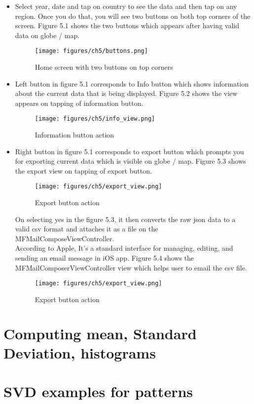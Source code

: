 \begin{itemize}
    \item Select year, date and tap on country to see the data and then tap on any region. Once you do that, you will see two buttons on both top corners of the screen. Figure 5.1 shows the two buttons which appears after having valid data on globe / map. \\
    
      \begin{figure}[H]
            \centering
            \texttt{[image: figures/ch5/buttons.png]}
            \caption{\label{fig:buttons} Home screen with two buttons on top corners}
        \end{figure}
     
    \item Left button in figure 5.1 corresponds to Info button which shows information about the current data that is being displayed. Figure 5.2 shows the view appears on tapping of information button. \\
    
      \begin{figure}[H]
            \centering
            \texttt{[image: figures/ch5/info\_view.png]}
            \caption{\label{fig:info_button} Information button action}
        \end{figure}
       
     \item Right button in figure 5.1 corresponds to export button which prompts you for exporting current data which is visible on globe / map. Figure 5.3 shows the export view on tapping of export button. \\
     
     \begin{figure}[H]
            \centering
            \texttt{[image: figures/ch5/export\_view.png]}
            \caption{\label{fig:info_button} Export button action}
    \end{figure}
    
    On selecting yes in the figure 5.3, it then converts the raw \gls{json} data to a valid \gls{csv} format and attaches it as a file on the MFMailComposeViewController. \\
    
    
    According to Apple, It's a standard interface for managing, editing, and sending an email message in \gls{iOS} app. Figure 5.4 shows the MFMailComposerViewController view which helps user to email the \gls{csv} file.
    
    \begin{figure}[H]
            \centering
            \texttt{[image: figures/ch5/export\_view.png]}
            \caption{\label{fig:info_button} Export button action}
    \end{figure}
    
\end{itemize}

\section{Computing mean, Standard Deviation, histograms}

\section{SVD examples for patterns}


